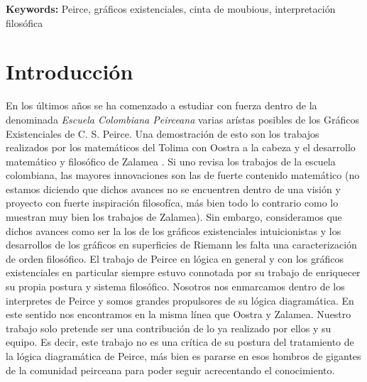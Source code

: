 \documentclass[
	fontsize=10pt, %
	twoside=true, %
	secnumdepth=1, %
	abstract=true, %
]{kaohandt}
\begin{document}
{\noindent\textbf{Keywords:} Peirce, gráficos existenciales, cinta de moubious, interpretación filosófica}

\medskip


\section{Introducción}
\label{sec:Introducción}

En los últimos años se ha comenzado a estudiar con fuerza dentro de la denominada \textit{Escuela Colombiana Peirceana} varias arístas posibles de los Gráficos Existenciales de C. S. Peirce. Una demostración de esto son los trabajos realizados por los matemáticos del Tolima con Oostra a la cabeza  y el desarrollo matemático y filosófico de Zalamea . Si uno revisa los trabajos de la escuela colombiana, las mayores innovaciones son las de fuerte contenido matemático (no estamos diciendo que dichos avances no se encuentren dentro de una visión y proyecto con fuerte inspiración filosofíca, más bien todo lo contrario como lo muestran muy bien los trabajos de Zalamea). Sin embargo, consideramos que dichos avances como ser la los de los gráficos existenciales intuicionistas y los desarrollos de los gráficos en superficies de Riemann les falta una caracterización de orden filosófico. El trabajo de Peirce en lógica en general y con los gráficos existenciales en particular siempre estuvo connotada por su trabajo de enriquecer su propia postura y sistema filosófico. Nosotros nos enmarcamos dentro de los interpretes de Peirce y somos grandes propulsores de su lógica diagramática. En este sentido nos encontramos en la misma línea que Oostra y Zalamea. Nuestro trabajo solo pretende ser una contribución de lo ya realizado por ellos y su equipo. Es decir, este trabajo no es una crítica de su postura del tratamiento de la lógica diagramática de Peirce, más bien es pararse en esos hombros de gigantes de la comunidad peirceana para poder seguir acrecentando el conocimiento.
\end{document}
